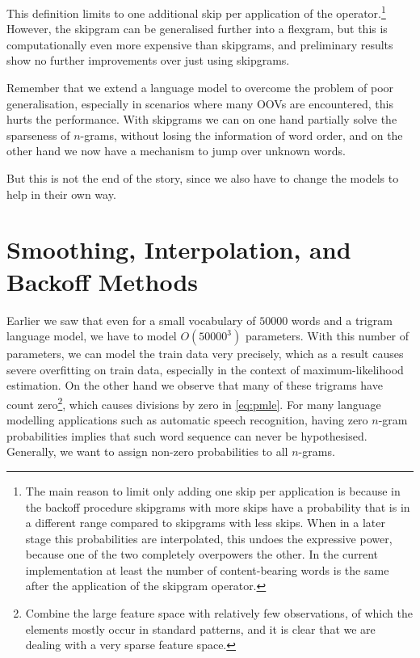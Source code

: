 This definition limits to one additional skip per application of the operator.\footnote{The main reason to limit only adding one skip per application is because in the backoff procedure skipgrams with more skips have a probability that is in a different range compared to skipgrams with less skips. When in a later stage this probabilities are interpolated, this undoes the expressive power, because one of the two completely overpowers the other. In the current implementation at least the number of content-bearing words is the same after the application of the skipgram operator.} However, the skipgram can be generalised further into a flexgram\autocite{gompel2016efficient}, but this is computationally even more expensive than skipgrams, and preliminary results show no further improvements over just using skipgrams.

Remember that we extend a language model to overcome the problem of poor generalisation, especially in scenarios where many OOVs are encountered, this hurts the performance. With skipgrams we can on one hand partially solve the sparseness of $n$-grams, without losing the information of word order, and on the other hand we now have a mechanism to jump over unknown words.

But this is not the end of the story, since we also have to change the models to help in their own way.


\section{Smoothing, Interpolation, and Backoff Methods}
Earlier we saw that even for a small vocabulary of $50000$ words and a trigram language model, we have to model $O(50000^3)$ parameters. With this number of parameters, we can model the train data very precisely, which as a result causes severe overfitting on train data, especially in the context of maximum-likelihood estimation. On the other hand we observe that many of these trigrams have count zero\footnote{Combine the large feature space with relatively few observations, of which the elements mostly occur in standard patterns, and it is clear that we are dealing with a very sparse feature space.}, which causes divisions by zero in \cref{eq:pmle}. For many language modelling applications such as automatic speech recognition, having zero $n$-gram probabilities implies that such word sequence can never be hypothesised. Generally, we want to assign non-zero probabilities to all $n$-grams.\autocite{jevtic2005estimation}


